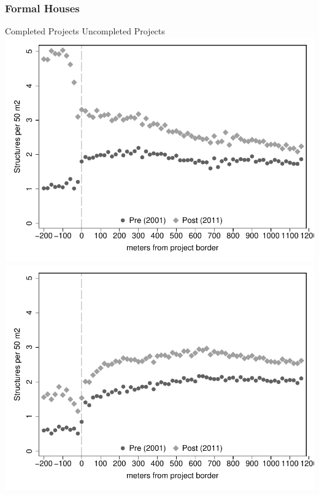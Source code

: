 \documentclass[aspectratio=149]{beamer}
\begin{document}
\begin{frame}
\frametitle{Formal Houses}
\hspace{10mm} Completed Projects \hspace{30mm} Uncompleted Projects
\hspace*{-10mm}
\includegraphics[scale=.48]{bblu_for_c.pdf}
\includegraphics[scale=.48]{bblu_for_p.pdf}
\end{frame}
\end{document}
